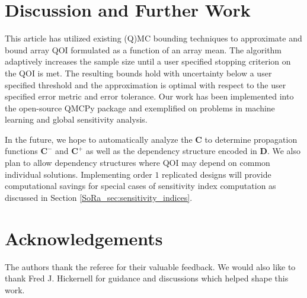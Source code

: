 \documentclass[graybox]{svmult}
\begin{document}
\section{Discussion and Further Work} \label{SoRa_sec:conclusions}

This article has utilized existing (Q)MC bounding techniques to approximate and bound array QOI formulated as a function of an array mean. The algorithm adaptively increases the sample size until a user specified stopping criterion on the QOI is met. The resulting bounds hold with uncertainty below a user specified threshold and the approximation is optimal with respect to the user specified error metric and error tolerance. Our work has been implemented into the open-source QMCPy package and exemplified on problems in machine learning and global sensitivity analysis. 

In the future, we hope to automatically analyze the $\boldsymbol{C}$ to determine propagation functions $\boldsymbol{C}^-$ and $\boldsymbol{C}^+$ as well as the dependency structure encoded in $\boldsymbol{D}$. We also plan to allow dependency structures where QOI may depend on common individual solutions. Implementing order $1$ replicated designs will provide computational savings for special cases of sensitivity index computation as discussed in Section \ref{SoRa_sec:sensitivity_indices}. 

\section*{Acknowledgements}

The authors thank the referee for their valuable feedback. We would also like to thank Fred J. Hickernell for guidance and discussions which helped shape this work. 

% 
% 
\end{document}
